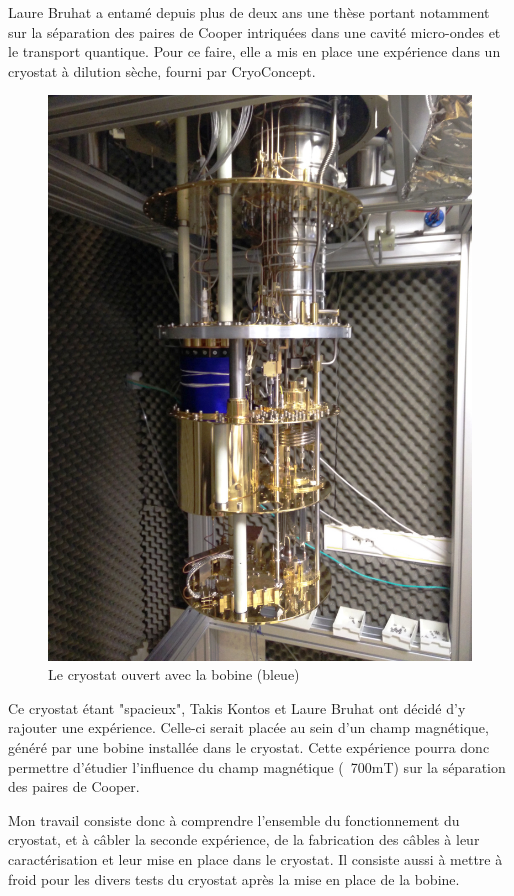 
Laure Bruhat a entamé depuis plus de deux ans une thèse portant notamment sur la séparation des paires de Cooper intriquées dans une cavité micro-ondes et le transport quantique. Pour ce faire, elle a mis en place une expérience dans un cryostat à dilution sèche, fourni par CryoConcept.
\par
\begin{figure}[h]
    \begin{center}
        \includegraphics[height=0.7\textwidth]{Images/Global.jpg}
        \caption*{Le cryostat ouvert avec la bobine (bleue)}
        \label{photo_separateur_nanotube}
    \end{center}
\end{figure}


Ce cryostat étant "spacieux", Takis Kontos et Laure Bruhat ont décidé d'y rajouter une expérience. Celle-ci serait placée au sein d'un champ magnétique, généré par une bobine installée dans le cryostat. Cette expérience pourra donc permettre d'étudier l'influence du champ magnétique (~700mT) sur la séparation des paires de Cooper.
\par

Mon travail consiste donc à comprendre l'ensemble du fonctionnement du cryostat, et à câbler la seconde expérience, de la fabrication des câbles à leur caractérisation et leur mise en place dans le cryostat. Il consiste aussi à mettre à froid pour les divers tests du cryostat après la mise en place de la bobine.
